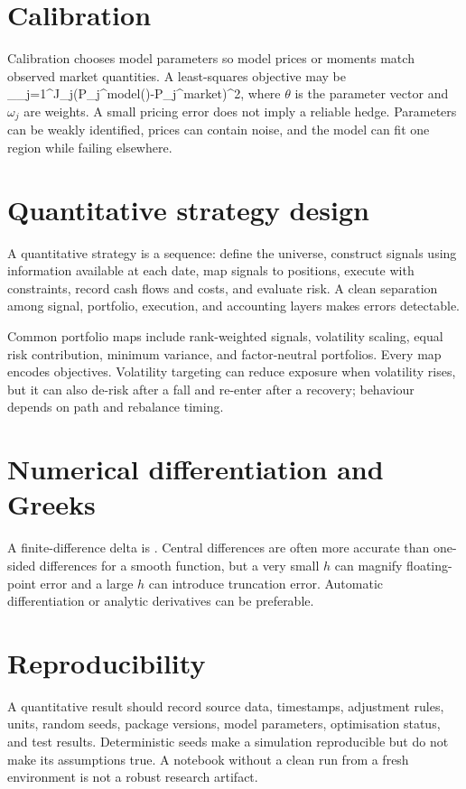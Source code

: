 \section{Calibration}
Calibration chooses model parameters so model prices or moments match observed market quantities. A least-squares objective may be
  \min_{\theta}\sum_{j=1}^{J}\omega_j\left(P_j^{model}(\theta)-P_j^{market}\right)^2,
\closeformula
where $\theta$ is the parameter vector and $\omega_j$ are weights. A small pricing error does not imply a reliable hedge. Parameters can be weakly identified, prices can contain noise, and the model can fit one region while failing elsewhere.

\section{Quantitative strategy design}
A quantitative strategy is a sequence: define the universe, construct signals using information available at each date, map signals to positions, execute with constraints, record cash flows and costs, and evaluate risk. A clean separation among signal, portfolio, execution, and accounting layers makes errors detectable.

Common portfolio maps include rank-weighted signals, volatility scaling, equal risk contribution, minimum variance, and factor-neutral portfolios. Every map encodes objectives. Volatility targeting can reduce exposure when volatility rises, but it can also de-risk after a fall and re-enter after a recovery; behaviour depends on path and rebalance timing.

\section{Numerical differentiation and Greeks}
A finite-difference delta is
  \Delta\approx{}.
\closeformula
Central differences are often more accurate than one-sided differences for a smooth function, but a very small $h$ can magnify floating-point error and a large $h$ can introduce truncation error. Automatic differentiation or analytic derivatives can be preferable.

\section{Reproducibility}
A quantitative result should record source data, timestamps, adjustment rules, units, random seeds, package versions, model parameters, optimisation status, and test results. Deterministic seeds make a simulation reproducible but do not make its assumptions true. A notebook without a clean run from a fresh environment is not a robust research artifact.

